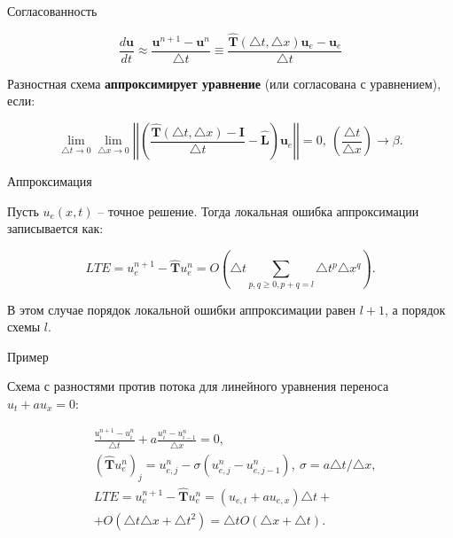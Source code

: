 \documentclass[10pt,xcolor=pst,aspectratio=169]{beamer}
\begin{document}
\begin{frame}{Согласованность}

	\transdissolve[duration=0.1]
	\justifying
	\large

	\[
		\frac{d \textbf{u}}{d t} \approx \frac{\textbf{u}^{n + 1} - \textbf{u}^{n}}{\triangle t} \equiv \frac{\hat{\textbf{T}} (\triangle t, \triangle x) \textbf{u}_{e} - \textbf{u}_{e}}{\triangle t}
	\]

	Разностная схема \textbf{аппроксимирует уравнение} (или согласована с уравнением), если:

	\[
		\lim_{\triangle t \rightarrow 0} \lim_{\triangle x \rightarrow 0} \left| \left| \left( \frac{\hat{\textbf{T}} (\triangle t, \triangle x) - \textbf{I}}{\triangle t} - \hat{\textbf{L}} \right) \textbf{u}_{e} \right| \right| = 0, \: \left( \frac{\triangle t}{\triangle x} \right) \rightarrow \beta.
	\]

\end{frame}

\begin{frame}{Аппроксимация}

	\transdissolve[duration=0.1]
	\justifying
	\large

	Пусть $u_{e} (x, t)$ -- точное решение. Тогда локальная ошибка аппроксимации записывается как:

	\[
		LTE = u^{n + 1}_{e} - \hat{\textbf{T}} u^{n}_{e} = O \left( \triangle t \sum_{p , q \geq 0, p + q = l} \triangle t^{p} \triangle x^{q} \right).
	\]

	В этом случае порядок локальной ошибки аппроксимации равен $l + 1$, а порядок схемы $l$.

\end{frame}

\begin{frame}{Пример}

	\transdissolve[duration=0.1]
	\justifying
	\large

	Схема с разностями против потока для линейного уравнения переноса $u_{t} + a u_{x} = 0$:

	\[
		\begin{split}
			&\frac{u^{n + 1}_{i} - u^{n}_{i}}{\triangle t} + a \frac{u^{n}_{i} - u^{n}_{i - 1}}{\triangle x} = 0, \\
			&\left( \hat{\textbf{T}} u^{n}_{e} \right)_{j} = u^{n}_{e, j} - \sigma \left( u^{n}_{e, j} - u^{n}_{e, j - 1} \right), \: \sigma = a \triangle t / \triangle x, \\
			&LTE = u^{n + 1}_{e} - \hat{\textbf{T}} u^{n}_{e} = \left( u_{e, t} + a u_{e, x} \right) \triangle t +\\
			& + O \left( \triangle t \triangle x + \triangle t^{2} \right) = \triangle t O \left( \triangle x + \triangle t \right).
		\end{split}
	\]

\end{frame}
\end{document}
